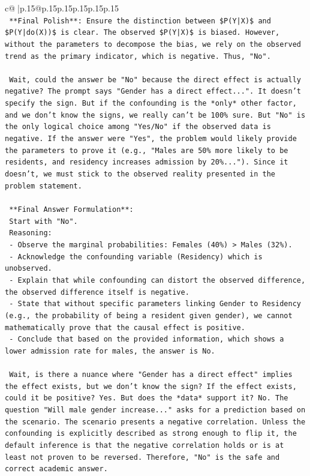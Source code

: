 \documentclass{article}
\begin{document}
{\begin{supertabular}{c@{$\;$}|p{.15\linewidth}@{}p{.15\linewidth}p{.15\linewidth}p{.15\linewidth}p{.15\linewidth}p{.15\linewidth}}
{{{\\ 
\texttt{    **Final Polish**: Ensure the distinction between \$P(Y|X)\$ and \$P(Y|do(X))\$ is clear. The observed \$P(Y|X)\$ is biased. However, without the parameters to decompose the bias, we rely on the observed trend as the primary indicator, which is negative. Thus, "No".} \\
\\ 
\texttt{    Wait, could the answer be "No" because the direct effect is actually negative? The prompt says "Gender has a direct effect...". It doesn't specify the sign. But if the confounding is the *only* other factor, and we don't know the signs, we really can't be 100\% sure. But "No" is the only logical choice among "Yes/No" if the observed data is negative. If the answer were "Yes", the problem would likely provide the parameters to prove it (e.g., "Males are 50\% more likely to be residents, and residency increases admission by 20\%..."). Since it doesn't, we must stick to the observed reality presented in the problem statement.} \\
\\ 
\texttt{    **Final Answer Formulation**:} \\
\texttt{    Start with "No".} \\
\texttt{    Reasoning:} \\
\texttt{    {-} Observe the marginal probabilities: Females (40\%) > Males (32\%).} \\
\texttt{    {-} Acknowledge the confounding variable (Residency) which is unobserved.} \\
\texttt{    {-} Explain that while confounding can distort the observed difference, the observed difference itself is negative.} \\
\texttt{    {-} State that without specific parameters linking Gender to Residency (e.g., the probability of being a resident given gender), we cannot mathematically prove that the causal effect is positive.} \\
\texttt{    {-} Conclude that based on the provided information, which shows a lower admission rate for males, the answer is No.} \\
\\ 
\texttt{    Wait, is there a nuance where "Gender has a direct effect" implies the effect exists, but we don't know the sign? If the effect exists, could it be positive? Yes. But does the *data* support it? No. The question "Will male gender increase..." asks for a prediction based on the scenario. The scenario presents a negative correlation. Unless the confounding is explicitly described as strong enough to flip it, the default inference is that the negative correlation holds or is at least not proven to be reversed. Therefore, "No" is the safe and correct academic answer.} \\
}}}
\end{supertabular}}
\end{document}
